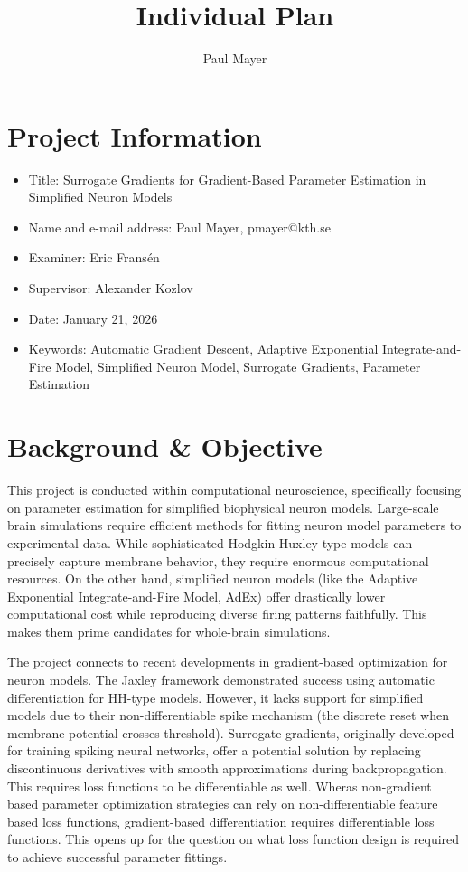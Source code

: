 \documentclass{article}
\title{Individual Plan}
\author{Paul Mayer}
\begin{document}
\maketitle

\section{Project Information}

\begin{itemize}
    \item Title: Surrogate Gradients for Gradient-Based Parameter Estimation in Simplified Neuron Models
    \item Name and e-mail address: Paul Mayer, pmayer@kth.se
    \item Examiner: Eric Frans\'en
    \item Supervisor: Alexander Kozlov
    \item Date: January 21, 2026
    \item Keywords: Automatic Gradient Descent, Adaptive Exponential Integrate-and-Fire Model, Simplified Neuron Model, Surrogate Gradients, Parameter Estimation
\end{itemize}

\section{Background \& Objective}

This project is conducted within computational neuroscience, specifically focusing on parameter estimation for simplified biophysical neuron models.
Large-scale brain simulations require efficient methods for fitting neuron model parameters to experimental data.
While sophisticated Hodgkin-Huxley-type models can precisely capture membrane behavior, they require enormous computational resources.
On the other hand, simplified neuron models (like the Adaptive Exponential Integrate-and-Fire Model, AdEx) offer drastically lower computational cost while reproducing diverse firing patterns faithfully.
This makes them prime candidates for whole-brain simulations.

The project connects to recent developments in gradient-based optimization for neuron models.
The Jaxley framework demonstrated success using automatic differentiation for HH-type models.
However, it lacks support for simplified models due to their non-differentiable spike mechanism (the discrete reset when membrane potential crosses threshold).
Surrogate gradients, originally developed for training spiking neural networks, offer a potential solution by replacing discontinuous derivatives with smooth approximations during backpropagation.
This requires loss functions to be differentiable as well.
Wheras non-gradient based parameter optimization strategies can rely on non-differentiable feature based loss functions, gradient-based differentiation requires differentiable loss functions.
This opens up for the question on what loss function design is required to achieve successful parameter fittings.
\end{document}
